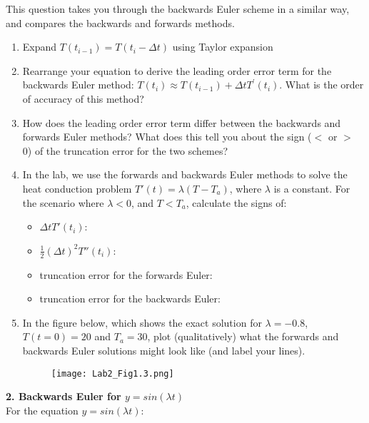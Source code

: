 \documentclass[12pt]{article}
\begin{document}
This question takes you through the backwards Euler scheme in a similar way, and compares the backwards and forwards methods.
\begin{enumerate}[nosep]
\item Expand $T(t_{i-1}) = T(t_i - \Delta t)$ using Taylor expansion
\vspace{0.5in}

\item Rearrange your equation to derive the leading order error term for the backwards Euler method: $T(t_{i}) \approx T(t_{i-1}) + \Delta t T^\prime(t_i)$. What is the order of accuracy of this method? 
\vspace{0.6in}

\item How does the leading order error term differ between the backwards and forwards Euler methods? What does this tell you about the sign ($<$ or $>$ 0) of the truncation error for the two schemes?
\vspace{0.3in}

\item In the lab, we use the forwards and backwards Euler methods to solve the heat conduction problem $T'(t) = \lambda(T-T_a)$, where $\lambda$ is a constant. For the scenario where $\lambda < 0$, and $T < T_a$, calculate the signs of:
\begin{itemize}
    \item $\Delta t T'(t_i)$:
    \item $\frac{1}{2} (\Delta t)^2 T''(t_i)$:
    \item truncation error for the forwards Euler:
    \item truncation error for the backwards Euler:
\end{itemize}

\item In the figure below, which shows the exact solution for $\lambda = -0.8$, $T(t=0) = 20$ and $T_a = 30$, plot (qualitatively) what the forwards and backwards Euler solutions might look like (and label your lines).

\begin{figure}[h!]
\texttt{[image: Lab2\_Fig1.3.png]}
\end{figure}
\end{enumerate}
\textbf{2. Backwards Euler for $y = sin(\lambda t)$}  \\
For the equation $y = sin(\lambda t)$:
\end{document}
